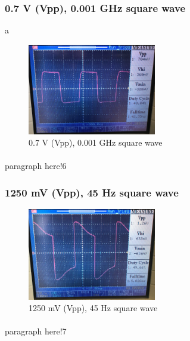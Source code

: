 \documentclass[pdftex,12pt,a4paper]{article}
\begin{document}
\begin{flushleft}
\subsubsection{0.7 V (Vpp), 0.001 GHz square wave}
a
\begin{figure}[h]
    \centering
	\includegraphics[width=0.5\textwidth]{Photos/5_6_closeup.jpg}
	\caption{0.7 V (Vpp), 0.001 GHz square wave}
	\label{fig9}
\end{figure}
\paragraph{}
paragraph here!6
\end{flushleft}



\begin{flushleft}
\subsubsection{1250 mV (Vpp), 45 Hz square wave}
\begin{figure}[h]
    \centering
	\includegraphics[width=0.5\textwidth]{Photos/5_7_closeup.jpg}
	\caption{1250 mV (Vpp), 45 Hz square wave}
	\label{fig10}
\end{figure}
\paragraph{}
paragraph here!7
\end{flushleft}
\end{document}
